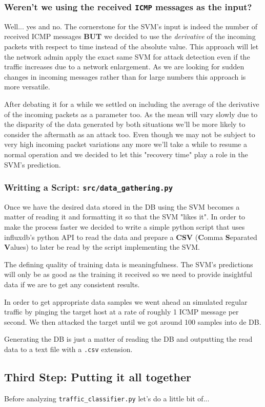 \documentclass[12pt]{article}
\newcommand{\newpar} {
    \vskip 1cm
}
\begin{document}
		\subsubsection{Weren't we using the received \texttt{ICMP} messages as the input?}
			Well... yes and no. The cornerstone for the SVM's input is indeed the number of received ICMP messages \textbf{BUT} we decided to use the \textit{derivative} of the incoming packets with respect to time instead of the absolute value. This approach will let the network admin apply the exact same SVM for attack detection even if the traffic increases due to a network enlargement. As we are looking for sudden changes in incoming messages rather than for large numbers this approach is more versatile.
			\newpar
			After debating it for a while we settled on including the average of the derivative of the incoming packets as a parameter too. As the mean will vary slowly due to the disparity of the data generated by both situations we'll be more likely to consider the aftermath as an attack too. Even though we may not be subject to very high incoming packet variations any more we'll take a while to resume a normal operation and we decided to let this "recovery time" play a role in the SVM's prediction.

		\subsubsection{Writting a Script: \texttt{src/data\_gathering.py}}
			Once we have the desired data stored in the DB using the SVM becomes a matter of reading it and formatting it so that the SVM "likes it". In order to make the process faster we decided to write a simple python script that uses influxdb's python API to read the data and prepare a \textbf{CSV} (\textbf{C}omma \textbf{S}eparated \textbf{V}alues) to later be read by the script implementing the SVM.
			\newpar
			The defining quality of training data is meaningfulness. The SVM's predictions will only be as good as the training it received so we need to provide insightful data if we are to get any consistent results.
			\newpar
			In order to get appropriate data samples we went ahead an simulated regular traffic by pinging the target host at a rate of roughly 1 ICMP message per second. We then attacked the target until we got around 100 samples into de DB.
			\newpar
			Generating the DB is just a matter of reading the DB and outputting the read data to a text file with a \texttt{.csv} extension.

	\subsection{Third Step: Putting it all together}
		Before analyzing \texttt{traffic\_classifier.py} let's do a little bit of...
\end{document}
